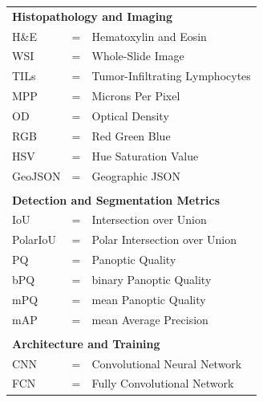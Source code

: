 \begin{tabular}{llp{3in}}
	\multicolumn{3}{l}{\textbf{Histopathology and Imaging}} \\
	H\&E      & \hspace{1.5cm} = & Hematoxylin and Eosin \\
	WSI       & \hspace{1.5cm} = & Whole-Slide Image \\
	TILs      & \hspace{1.5cm} = & Tumor-Infiltrating Lymphocytes \\
	MPP       & \hspace{1.5cm} = & Microns Per Pixel \\
	OD        & \hspace{1.5cm} = & Optical Density \\
	RGB       & \hspace{1.5cm} = & Red Green Blue \\
	HSV       & \hspace{1.5cm} = & Hue Saturation Value \\
	GeoJSON   & \hspace{1.5cm} = & Geographic JSON \\
	\\
	\multicolumn{3}{l}{\textbf{Detection and Segmentation Metrics}} \\
	IoU       & \hspace{1.5cm} = & Intersection over Union \\
	PolarIoU  & \hspace{1.5cm} = & Polar Intersection over Union \\
	PQ        & \hspace{1.5cm} = & Panoptic Quality \\
	bPQ       & \hspace{1.5cm} = & binary Panoptic Quality \\
	mPQ       & \hspace{1.5cm} = & mean Panoptic Quality \\
	mAP       & \hspace{1.5cm} = & mean Average Precision \\
	\\
	\multicolumn{3}{l}{\textbf{Architecture and Training}} \\
	CNN       & \hspace{1.5cm} = & Convolutional Neural Network \\
	FCN       & \hspace{1.5cm} = & Fully Convolutional Network \\

\end{tabular}
